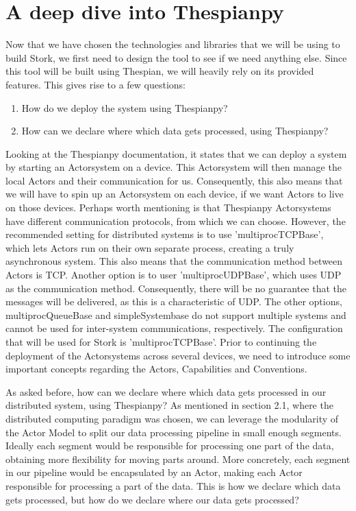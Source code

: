 \documentclass[a4paper]{article}
\begin{document}
\section{A deep dive into Thespianpy}
Now that we have chosen the technologies and libraries that we will be using to build Stork, we first need to design the tool to see if we need anything else. Since this tool will be built using Thespian, we will heavily rely on its provided features. This gives rise to a few questions:
\begin{enumerate}
    \item How do we deploy the system using Thespianpy?
    \item How can we declare where which data gets processed, using Thespianpy?
\end{enumerate}
Looking at the Thespianpy documentation, it states that we can deploy a system by starting an Actorsystem on a device. This Actorsystem will then manage the local Actors and their communication for us. Consequently, this also means that we will have to spin up an Actorsystem on each device, if we want Actors to live on those devices. Perhaps worth mentioning is that Thespianpy Actorsystems have different communication protocols, from which we can choose. However, the recommended setting for distributed systems is to use 'multiprocTCPBase', which lets Actors run on their own separate process, creating a truly asynchronous system. This also means that the communication method between Actors is TCP. Another option is to user 'multiprocUDPBase', which uses UDP as the communication method. Consequently, there will be no guarantee that the messages will be delivered, as this is a characteristic of UDP. The other options, multiprocQueueBase and simpleSystembase do not support multiple systems and cannot be used for inter-system communications, respectively. The configuration that will be used for Stork is 'multiprocTCPBase'. Prior to continuing the deployment of the Actorsystems across several devices, we need to introduce some important concepts regarding the Actors, Capabilities and Conventions.

As asked before, how can we declare where which data gets processed in our distributed system, using Thespianpy? As mentioned in section 2.1, where the distributed computing paradigm was chosen, we can leverage the modularity of the Actor Model to split our data processing pipeline in small enough segments. Ideally each segment would be responsible for processing one part of the data, obtaining more flexibility for moving parts around. More concretely, each segment in our pipeline would be encapsulated by an Actor, making each Actor responsible for processing a part of the data. This is how we declare which data gets processed, but how do we declare where our data gets processed?
\end{document}
